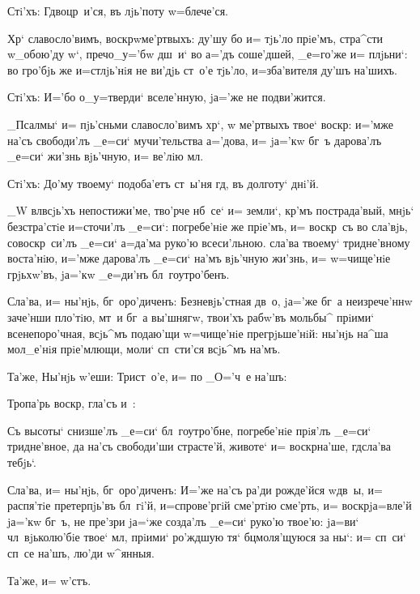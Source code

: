 Стi'хъ: Гд воцр~и'ся, въ лjь'поту w=блече'ся.

Хр` славосло'вимъ, воскр w\т ме'ртвыхъ: 
ду'шу бо и= тjь'ло прiе'мъ, стра^сти w\т_обою'ду 
w`, преч о_у='бw дш~и` во а='дъ соше'дшей, 
_е=го'же и= плjьни`: во гро'бjь же и=стлjь'нiя не ви'дjь 
ст~о'е тjь'ло, и=зба'вителя ду'шъ на'шихъ.

Стi'хъ: И='бо о_у=тверди` вселе'нную, jа='же не 
подви'жится.

_Псалмы` и= пjь'сньми славосло'вимъ хр`, w\т 
ме'ртвыхъ твое` воскр: и='мже на'съ свободи'лъ 
_е=си` мучи'тельства а='дова, и= jа='кw бг~ъ дарова'лъ 
_е=си` жи'знь вjь'чную, и= ве'лiю мл.

Стi'хъ: До'му твоему` подоба'етъ ст~ы'ня гд, въ 
долготу` днi'й.

_W вл всjь'хъ непостижи'ме, тво'рче нб~се` и= 
земли`, кр'мъ пострада'вый, мнjь` безстра'стiе 
и=сточи'лъ _е=си`: погребе'нiе же прiе'мъ, и= воскр~съ во 
сла'вjь, совоскр~си'лъ _е=си` а=да'ма руко'ю всеси'льною. 
сла'ва твоему` тридне'вному воста'нiю, и='мже дарова'лъ 
_е=си` на'мъ вjь'чную жи'знь, и= w=чище'нiе грjьхw'въ, 
jа='кw _е=ди'нъ бл~гоутро'бенъ.

Сла'ва, и= ны'нjь, бг~оро'диченъ: Безневjь'стная дв~о, 
jа='же бг~а неизрече'ннw заче'нши пло'тiю, мт~и бг~а 
вы'шнягw, твои'хъ рабw'въ мольбы^ прiими` всенепоро'чная, 
всjь^мъ подаю'щи w=чище'нiе прегрjьше'нiй: ны'нjь на^ша 
мол_е'нiя прiе'млющи, моли` сп~сти'ся всjь^мъ на'мъ.

Та'же, Ны'нjь w'еши: Трист~о'е, и= по _О='ч~е 
на'шъ:

Тропа'рь воскр, гла'съ и~:

Съ высоты` снизше'лъ _е=си` бл~гоутро'бне, погребе'нiе 
прiя'лъ _е=си` тридне'вное, да на'съ свободи'ши 
страсте'й, животе` и= воскр на'ше, гд сла'ва 
тебjь`.

Сла'ва, и= ны'нjь, бг~оро'диченъ: И='же на'съ ра'ди 
рожде'йся w\т дв~ы, и= распя'тiе претерпjь'въ бл~гi'й, 
и=спрове'ргiй сме'ртiю сме'рть, и= воскр jа=вле'й 
jа='кw бг~ъ, не пре'зри jа=`же созда'лъ _е=си` руко'ю 
твое'ю: jа=ви` чл~вjьколю'бiе твое` мл, прiими` 
ро'ждшую тя` бц моля'щуюся за ны`: и= сп~си` сп~се 
на'шъ, лю'ди w^янныя.

Та'же, и= w'стъ.
